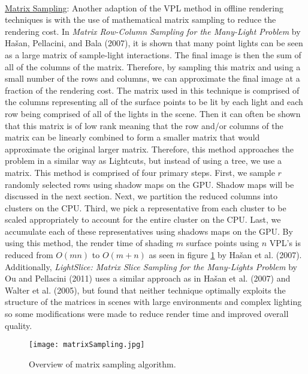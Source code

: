 \paragraph{}
\underline{Matrix Sampling}: Another adaption of the VPL method in offline rendering techniques is with the use of mathematical matrix sampling to reduce the rendering cost.  In \textit{Matrix Row-Column Sampling for the Many-Light Problem} by Ha\v{s}an, Pellacini, and Bala (2007), it is shown that many point lights can be seen as a large matrix of sample-light interactions.  The final image is then the sum of all of the columns of the matrix.  Therefore, by sampling this matrix and using a small number of the rows and columns, we can approximate the final image at a fraction of the rendering cost.  The matrix used in this technique is comprised of the columns representing all of the surface points to be lit by each light and each row being comprised of all of the lights in the scene.  Then it can often be shown that this matrix is of low rank meaning that the row and/or columns of the matrix can be linearly combined to form a smaller matrix that would approximate the original larger matrix.  Therefore, this method approaches the problem in a similar way as Lightcuts, but instead of using a tree, we use a matrix.  This method is comprised of four primary steps.  First, we sample $r$ randomly selected rows using shadow maps on the GPU.  Shadow maps will be discussed in the next section.  Next, we partition the reduced columns into clusters on the CPU.  Third, we pick a representative from each cluster to be scaled appropriately to account for the entire cluster on the CPU.  Last, we accumulate each of these representatives using shadows maps on the GPU.  By using this method, the render time of shading $m$ surface points using $n$ VPL's is reduced from $O(mn)$ to $O(m+n)$ as seen in figure \ref{fig:matrixSampling} by Ha\v{s}an et al. (2007).  Additionally, \textit{LightSlice: Matrix Slice Sampling for the Many-Lights Problem} by Ou and Pellacini (2011) uses a similar approach as in Ha\v{s}an et al. (2007) and Walter et al. (2005), but found that neither technique optimally exploits the structure of the matrices in scenes with large environments and complex lighting so some modifications were made to reduce render time and improved overall quality.

\begin{figure}[h!]
  \centering
    \texttt{[image: matrixSampling.jpg]}
  \caption{Overview of matrix sampling algorithm.}
	\label{fig:matrixSampling}
\end{figure}

